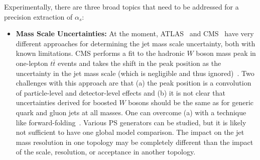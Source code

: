 \documentclass[11pt,letterpaper]{article}
\begin{document}
Experimentally, there are three broad topics that need to be addressed for a precision extraction of $\alpha_s$:
%
\begin{itemize}
%
\item {\bf Mass Scale Uncertainties:} At the moment, ATLAS~\cite{Aaboud:2017qwh} and CMS~\cite{CMS-PAS-SMP-16-010} have very different approaches for determining the jet mass scale uncertainty, both with known limitations.
%
CMS performs a fit to the hadronic $W$ boson mass peak in one-lepton $t\bar{t}$ events and takes the shift in the peak position as the uncertainty in the jet mass scale (which is negligible and thus ignored)~\cite{Sirunyan:2016cao}.
%
Two challenges with this approach are that (a) the peak position is a convolution of particle-level and detector-level effects and (b) it is not clear that uncertainties derived for boosted $W$ bosons should be the same as for generic quark and gluon jets at all masses.
%
One can overcome (a) with a technique like forward-folding~\cite{ATLAS-CONF-2016-008,ATLAS-CONF-2016-035}.
%
Various PS generators can be studied, but it is likely not sufficient to have one global model comparison.
%
The impact on the jet mass resolution in one topology may be completely different than the impact of the scale, resolution, or acceptance in another topology.


\end{itemize}
\end{document}
